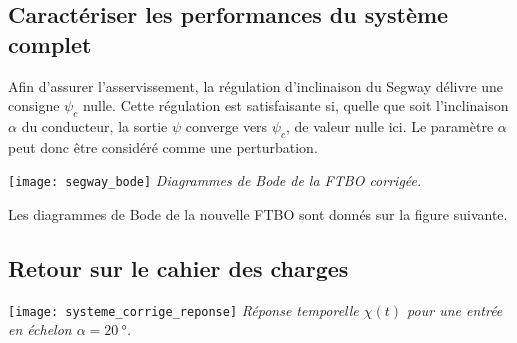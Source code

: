 \begin{multicols}{2}


\subsection*{Caractériser les performances du système complet}

Afin d'assurer l'asservissement, la régulation d'inclinaison du Segway\textregistered{} délivre une consigne $\psi_c$ nulle.  Cette régulation est satisfaisante si, quelle que soit l'inclinaison $\alpha$ du conducteur, la sortie $\psi$ converge vers $\psi_c$, de valeur nulle ici.  Le paramètre $\alpha$ peut donc être considéré comme une perturbation.




\begin{center}%
\texttt{[image: segway\_bode]}
\textit{Diagrammes de Bode de la FTBO corrigée.} \label{ex_Segway_bode}
\end{center}%



Les diagrammes de Bode de la nouvelle FTBO sont donnés sur la figure suivante.%





\subsection*{Retour sur le cahier des charges}
\begin{center}
\texttt{[image: systeme\_corrige\_reponse]}
\textit{Réponse temporelle $\chi(t)$ pour une entrée en échelon $\alpha=\SI{20}{\degree}$.}
\label{ex_segway_reponse_temporelle}
\end{center}





\end{multicols}
